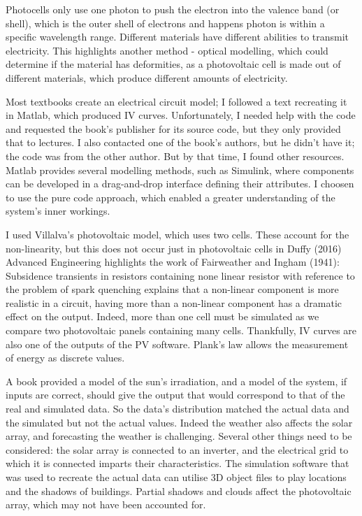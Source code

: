 \documentclass{article}
\begin{document}
Photocells only use one photon to push the electron into the valence band (or shell), which is the outer shell of electrons and happens photon is within a specific wavelength range. Different materials have different abilities to transmit electricity. This highlights another method - optical modelling, which could determine if the material has deformities, as a photovoltaic cell is made out of different materials, which produce different amounts of electricity. 

Most textbooks create an electrical circuit model; I followed a text recreating it in Matlab, which produced IV curves. Unfortunately, I needed help with the code and requested the book's publisher for its source code, but they only provided that to lectures. I also contacted one of the book's authors, but he didn't have it; the code was from the other author. But by that time, I found other resources. Matlab provides several modelling methods, such as Simulink, where components can be developed in a drag-and-drop interface defining their attributes. I choosen to use the pure code approach, which enabled a greater understanding of the system's inner workings. 

I used Villalva's photovoltaic model, which uses two cells. These account for the non-linearity, but this does not occur just in photovoltaic cells in Duffy (2016) Advanced Engineering highlights the work of Fairweather and Ingham (1941): Subsidence transients in resistors containing none linear resistor with reference to the problem of spark quenching explains that a non-linear component is more realistic in a circuit, having more than a non-linear component has a dramatic effect on the output. Indeed, more than one cell must be simulated as we compare two photovoltaic panels containing many cells. Thankfully, IV curves are also one of the outputs of the PV software. Plank's law allows the measurement of energy as discrete values. 

A book provided a model of the sun's irradiation, and a model of the system, if inputs are correct, should give the output that would correspond to that of the real and simulated data. So the data's distribution matched the actual data and the simulated but not the actual values. Indeed the weather also affects the solar array, and forecasting the weather is challenging. Several other things need to be considered: the solar array is connected to an inverter, and the electrical grid to which it is connected imparts their characteristics. The simulation software that was used to recreate the actual data can utilise 3D object files to play locations and the shadows of buildings. Partial shadows and clouds affect the photovoltaic array, which may not have been accounted for. 
\end{document}
